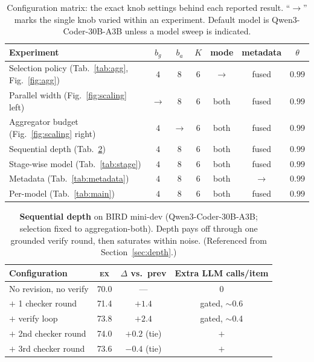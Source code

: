 \documentclass{article}
\newcommand{\ex}{\textsc{ex}\xspace}
\begin{document}
\begin{table}[h]
\centering
\small
\caption{Configuration matrix: the exact knob settings behind each reported result. ``$\rightarrow$'' marks the single knob varied within an experiment. Default model is Qwen3-Coder-30B-A3B unless a model sweep is indicated.}
\label{tab:config}
\begin{tabular}{@{}lcccccc@{}}
\toprule
\textbf{Experiment} & $b_g$ & $b_a$ & $K$ & \textbf{mode} & \textbf{metadata} & $\theta$ \\
\midrule
Selection policy (Tab.~\ref{tab:agg}, Fig.~\ref{fig:agg}) & $4$ & $8$ & $6$ & $\rightarrow$ & fused & $0.99$ \\
Parallel width (Fig.~\ref{fig:scaling} left) & $\rightarrow$ & $8$ & $6$ & both & fused & $0.99$ \\
Aggregator budget (Fig.~\ref{fig:scaling} right) & $4$ & $\rightarrow$ & $6$ & both & fused & $0.99$ \\
Sequential depth (Tab.~\ref{tab:depth}) & $4$ & $8$ & $6$ & both & fused & $0.99$ \\
Stage-wise model (Tab.~\ref{tab:stage}) & $4$ & $8$ & $6$ & both & fused & $0.99$ \\
Metadata (Tab.~\ref{tab:metadata}) & $4$ & $8$ & $6$ & both & $\rightarrow$ & $0.99$ \\
Per-model (Tab.~\ref{tab:main}) & $4$ & $8$ & $6$ & both & fused & $0.99$ \\
\bottomrule
\end{tabular}
\end{table}

\begin{table}[h]
\centering
\small
\caption{\textbf{Sequential depth} on BIRD mini-dev (Qwen3-Coder-30B-A3B; selection fixed to aggregation-both). Depth pays off through one grounded verify round, then saturates within noise. (Referenced from Section~\ref{sec:depth}.)}
\label{tab:depth}
\begin{tabular}{@{}lccc@{}}
\toprule
\textbf{Configuration} & \textbf{\ex} & \textbf{$\Delta$ vs.\ prev} & \textbf{Extra LLM calls/item} \\
\midrule
No revision, no verify        & 70.0 & ---   & $0$ \\
$+$ 1 checker round           & 71.4 & $+1.4$ & gated, $\sim$0.6 \\
$+$ verify loop               & 73.8 & $+2.4$ & gated, $\sim$0.4 \\
$+$ 2nd checker round         & 74.0 & $+0.2$ (tie) & $+$ \\
$+$ 3rd checker round         & 73.6 & $-0.4$ (tie) & $+$ \\
\bottomrule
\end{tabular}
\end{table}
\end{document}
